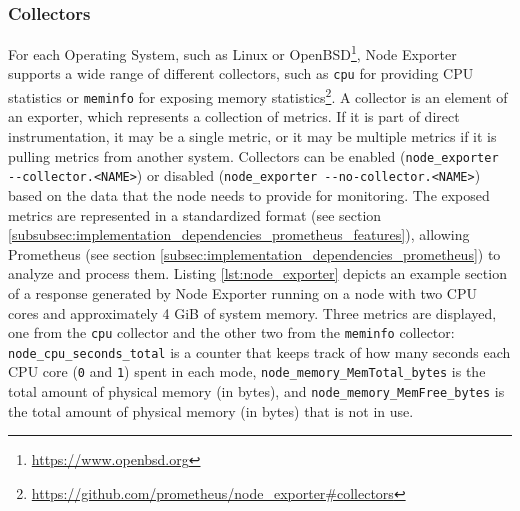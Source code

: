 \subsubsection{Collectors}
\label{subsubsec:implementation_dependencies_node_exporter-collectors}

For each Operating System, such as Linux or OpenBSD\footnote{\url{https://www.openbsd.org}},
Node Exporter supports a wide range of different collectors, such as \texttt{cpu}
for providing CPU statistics or \texttt{meminfo} for exposing memory statistics\footnote{\url{https://github.com/prometheus/node_exporter\#collectors}}.
A collector is an element of an exporter, which represents a collection of metrics.
If it is part of direct instrumentation, it may be a single metric, or it may be
multiple metrics if it is pulling metrics from another system\cite{prometheus_metrics}.
Collectors can be enabled (\lstinline[language=shell, basicstyle=\ttfamily, alsoletter={_, -, ., <, >},
morekeywords={[2]{node_exporter}}, morekeywords={[3]{--collector.<NAME>}}]{node_exporter --collector.<NAME>})
or disabled (\lstinline[language=shell, basicstyle=\ttfamily, alsoletter={_, -, ., <, >},
morekeywords={[2]{node_exporter}}, morekeywords={[3]{--no-collector.<NAME>}}]{node_exporter --no-collector.<NAME>})
based on the data that the node needs to provide for monitoring. The exposed metrics
are represented in a standardized format (see section
\ref{subsubsec:implementation_dependencies_prometheus_features}), allowing
Prometheus (see section \ref{subsec:implementation_dependencies_prometheus}) to
analyze and process them. Listing \ref{lst:node_exporter} depicts an example section
of a response generated by Node Exporter running on a node with two CPU cores and
approximately 4 GiB of system memory. Three metrics are displayed, one from the \texttt{cpu}
collector and the other two from the \texttt{meminfo} collector: \texttt{node\_cpu\_seconds\_total}
is a counter that keeps track of how many seconds each CPU core (\texttt{0} and \texttt{1})
spent in each mode, \texttt{node\_memory\_MemTotal\_bytes} is the total amount of
physical memory (in bytes), and \texttt{node\_memory\_MemFree\_bytes} is the total
amount of physical memory (in bytes) that is not in use.

